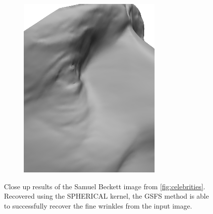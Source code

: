 \begin{figure}
\begin{subfigure}{0.23\textwidth}
        \includegraphics[width=\textwidth]{statistical_normals/images/gsfs_results/celebrities/samuel_beckett_spherical_wrinkles.png}
    \end{subfigure}
    \caption{Close up results of the Samuel Beckett image from \cref{fig:celebrities}.
             Recovered using the SPHERICAL kernel, the GSFS method is able to
             successfully recover the fine wrinkles from the input image.}
\label{fig:beckett-wrinkles}
\end{figure}
